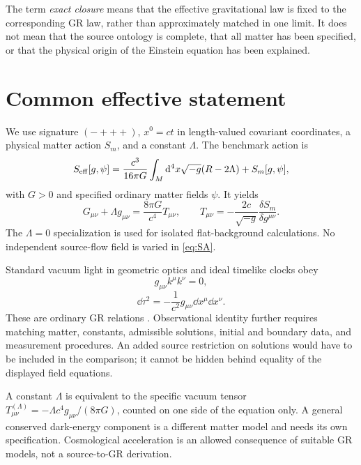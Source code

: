 \documentclass[11pt]{article}
\begin{document}
The term \emph{exact closure} means that the effective gravitational law is fixed to the corresponding GR law, rather than approximately matched in one limit. It does not mean that the source ontology is complete, that all matter has been specified, or that the physical origin of the Einstein equation has been explained.

\section{Common effective statement}
We use signature $(-+++)$, $x^0=ct$ in length-valued covariant coordinates, a physical matter action $S_m$, and a constant $\Lambda$. The benchmark action is
\begin{equation}
S_{\rm eff}[g,\psi]=\frac{c^3}{16\pi G}
\int_M\mathrm d^4x\sqrt{-g}(R-2\Lambda)+S_m[g,\psi],
\label{eq:SA}
\end{equation}
with $G>0$ and specified ordinary matter fields $\psi$. It yields
\begin{equation}
G_{\mu\nu}+\Lambda g_{\mu\nu}=\frac{8\pi G}{c^4}T_{\mu\nu},
\qquad T_{\mu\nu}=-\frac{2c}{\sqrt{-g}}\frac{\delta S_m}{\delta g^{\mu\nu}}.
\label{eq:einstein}
\end{equation}
The $\Lambda=0$ specialization is used for isolated flat-background calculations. No independent source-flow field is varied in \eqref{eq:SA}.

Standard vacuum light in geometric optics and ideal timelike clocks obey
\begin{equation}
g_{\mu\nu}k^\mu k^\nu=0,
\label{eq:null}
\end{equation}
\begin{equation}
\dd\tau^2=-\frac{1}{c^2}g_{\mu\nu}\dd x^\mu\dd x^\nu.
\label{eq:propertime}
\end{equation}
These are ordinary GR relations \parencite{Carroll1997}. Observational identity further requires matching matter, constants, admissible solutions, initial and boundary data, and measurement procedures. An added source restriction on solutions would have to be included in the comparison; it cannot be hidden behind equality of the displayed field equations.

A constant $\Lambda$ is equivalent to the specific vacuum tensor
$T^{(\Lambda)}_{\mu\nu}=-\Lambda c^4g_{\mu\nu}/(8\pi G)$, counted on one side of the equation only. A general conserved dark-energy component is a different matter model and needs its own specification. Cosmological acceleration is an allowed consequence of suitable GR models, not a source-to-GR derivation.
\end{document}
